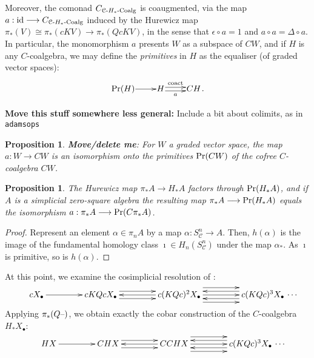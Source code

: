 \documentclass[11pt]{amsart}
\theoremstyle{plain}
\newtheorem{prop}[thm]{Proposition}
\theoremstyle{definition}
\newcommand{\DASH}{\textup{--}}
\renewcommand{\to}{\longrightarrow}
\newcommand{\calC}{\mathcal{C}}
\newcommand{\calc}{\mathcal{C}}
\theoremstyle{plain}
\newcommand{\HCoalg}{\textup{-$H_*$-Coalg}}
\newcommand{\Id}{\textup{id}}
\begin{document}
\begin{CPiAlgs and CHalgs}
Moreover, the comonad $C_{\calc\HCoalg}$ is coaugmented, via the map $a:\Id\to C_{\calc\HCoalg}$ induced by the Hurewicz map $\pi_*(V)\cong \pi_*(cKV)\to\pi_*(QcKV)$, in the sense that $\epsilon\circ a=1$ and $a\circ a=\Delta\circ a$. In particular, the monomorphism $a$ presents $W$ as a subspace of $CW$, and if $H$ is any $C$-coalgebra, we may define the \emph{primitives} in $H$ as the equaliser (of graded vector spaces):
\[\xymatrix@R=4mm@1{
\textup{Pr}(H)\ar[r]
&%
H\ar@<.5ex>[r]^-{\textup{coact}}
\ar@<-.5ex>[r]_-{a}
&%
CH%
}.\]
\begin{shaded}\small
\textbf{Move this stuff somewhere less general:} Include a bit about colimits, as in \verb|adamsops|
\begin{prop}
\textbf{Move/delete me}: For $W$ a graded vector space, the map $a:W\to CW$ is an isomorphism onto the primitives $\textup{Pr}(CW)$ of the cofree $C$-coalgebra $CW$.
\end{prop}
\begin{prop}
The Hurewicz map $\pi_*A\to H_*A$ factors through $\textup{Pr}(H_*A)$, and if $A$ is a simplicial zero-square algebra the resulting map $\pi_*A\to\textup{Pr}(H_*A)$ equals the isomorphism $a:\pi_*A\to\textup{Pr}(C\pi_*A)$.
\end{prop}
\begin{proof}
Represent an element $\alpha\in\pi_nA$ by a map $\alpha:S^n_\calC\to A$. Then, $h(\alpha)$ is the image of the fundamental homology class $\imath\in H_n(S^n_\calC)$ under the map $\alpha_*$. As $\imath$ is primitive, so is $h(\alpha)$.
\end{proof}
At this point, we examine the cosimplicial resolution of \cite[4.6]{BlumRiehlResolutions.pdf}:
\[
\vcenter{
\def\labelstyle{\scriptstyle}
\xymatrix@C=1.5cm@1{
cX_\bullet\,
\ar[r]
&
\,cKQcX_\bullet\,
\ar[r];[]
&
\,c(KQc)^2X_\bullet\,
\ar@<-1ex>[l];[]
\ar@<+1ex>[l];[]
\ar@<+1ex>[r];[]
\ar@<-1ex>[r];[]
&
\,c(KQc)^3X_\bullet\,\makebox[0cm][l]{\,$\cdots $}
\ar[l];[]
\ar@<-2ex>[l];[]
\ar@<+2ex>[l];[]
}}\]
Applying $\pi_*(Q\DASH)$, we obtain exactly the cobar construction of the $C$-coalgebra $H_*X_\bullet$:
\[
\vcenter{
\def\labelstyle{\scriptstyle}
\xymatrix@C=1.5cm@1{
HX\,
\ar[r]
&
\,CHX\,
\ar[r];[]
&
\,CCHX\,
\ar@<-1ex>[l];[]
\ar@<+1ex>[l];[]
\ar@<+1ex>[r];[]
\ar@<-1ex>[r];[]
&
\,c(KQc)^3X_\bullet\,\makebox[0cm][l]{\,$\cdots $}
\ar[l];[]
\ar@<-2ex>[l];[]
\ar@<+2ex>[l];[]
}}\]
\end{shaded}


\end{CPiAlgs and CHalgs}
\end{document}
